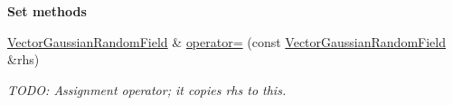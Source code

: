 \begin{Indent}{\bf Set methods}\par
\begin{DoxyCompactItemize}
\item 
\hyperlink{class_q_u_e_s_o_1_1_vector_gaussian_random_field}{Vector\-Gaussian\-Random\-Field} \& \hyperlink{class_q_u_e_s_o_1_1_vector_gaussian_random_field_a5c0963ff4c87895a69b941059b3f9afd}{operator=} (const \hyperlink{class_q_u_e_s_o_1_1_vector_gaussian_random_field}{Vector\-Gaussian\-Random\-Field} \&rhs)
\begin{DoxyCompactList}\small\item\em T\-O\-D\-O\-: Assignment operator; it copies {\ttfamily rhs} to {\ttfamily this}. \end{DoxyCompactList}\end{DoxyCompactItemize}
\end{Indent}
